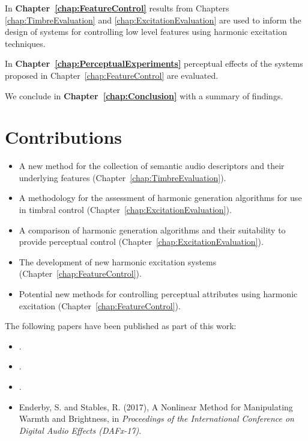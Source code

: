 	In {\bf{Chapter~\ref{chap:FeatureControl}}} results from Chapters \ref{chap:TimbreEvaluation} and
	\ref{chap:ExcitationEvaluation} are used to inform the design of systems for controlling low level features using
	harmonic excitation techniques.

	In {\bf{Chapter~\ref{chap:PerceptualExperiments}}} perceptual effects of the systems proposed in
	Chapter~\ref{chap:FeatureControl} are evaluated. 

	\note
	{
		We conclude in {\bf{Chapter~\ref{chap:Conclusion}}} with a summary of findings.
	}

\section{Contributions}
\label{sec:Introduction-Contributions}

	\begin{itemize}
		\item A new method for the collection of semantic audio descriptors and their underlying features
		      (Chapter~\ref{chap:TimbreEvaluation}).
		\item A methodology for the assessment of harmonic generation algorithms for use in timbral control
		      (Chapter~\ref{chap:ExcitationEvaluation}).
		\item A comparison of harmonic generation algorithms and their suitability to provide perceptual control
		      (Chapter~\ref{chap:ExcitationEvaluation}).
		\item The development of new harmonic excitation systems (Chapter~\ref{chap:FeatureControl}).
		\item Potential new methods for controlling perceptual attributes using harmonic excitation
		      (Chapter~\ref{chap:FeatureControl}).
	\end{itemize}

	The following papers have been published as part of this work:

	\begin{itemize}
		\item {}.
		\item {}.
		\item {}.
		\item Enderby, S. and Stables, R. (2017), A Nonlinear Method for Manipulating Warmth and Brightness, in
		      \emph{Proceedings of the International Conference on Digital Audio Effects (DAFx-17)}.
	\end{itemize}

